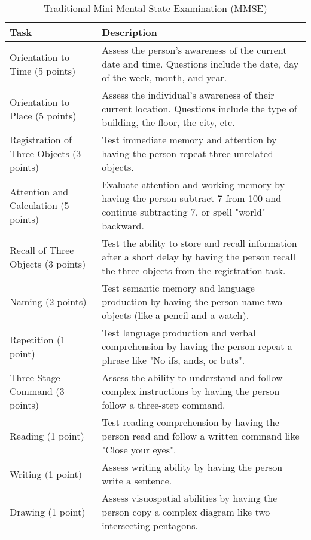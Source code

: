 \begin{table}[h!]
\centering
\caption{Traditional Mini-Mental State Examination (MMSE)}
\begin{tabular}{|p{}|p{}|}
\hline
\textbf{Task} & \textbf{Description} \\
\hline
Orientation to Time (5 points) & Assess the person's awareness of the current date and time. Questions include the date, day of the week, month, and year. \\
\hline
Orientation to Place (5 points) & Assess the individual's awareness of their current location. Questions include the type of building, the floor, the city, etc. \\
\hline
Registration of Three Objects (3 points) & Test immediate memory and attention by having the person repeat three unrelated objects. \\
\hline
Attention and Calculation (5 points) & Evaluate attention and working memory by having the person subtract 7 from 100 and continue subtracting 7, or spell "world" backward. \\
\hline
Recall of Three Objects (3 points) & Test the ability to store and recall information after a short delay by having the person recall the three objects from the registration task. \\
\hline
Naming (2 points) & Test semantic memory and language production by having the person name two objects (like a pencil and a watch). \\
\hline
Repetition (1 point) & Test language production and verbal comprehension by having the person repeat a phrase like "No ifs, ands, or buts". \\
\hline
Three-Stage Command (3 points) & Assess the ability to understand and follow complex instructions by having the person follow a three-step command. \\
\hline
Reading (1 point) & Test reading comprehension by having the person read and follow a written command like "Close your eyes". \\
\hline
Writing (1 point) & Assess writing ability by having the person write a sentence. \\
\hline
Drawing (1 point) & Assess visuospatial abilities by having the person copy a complex diagram like two intersecting pentagons. \\
\hline
\end{tabular}
\label{tab:traditional-mmse}
\end{table}





